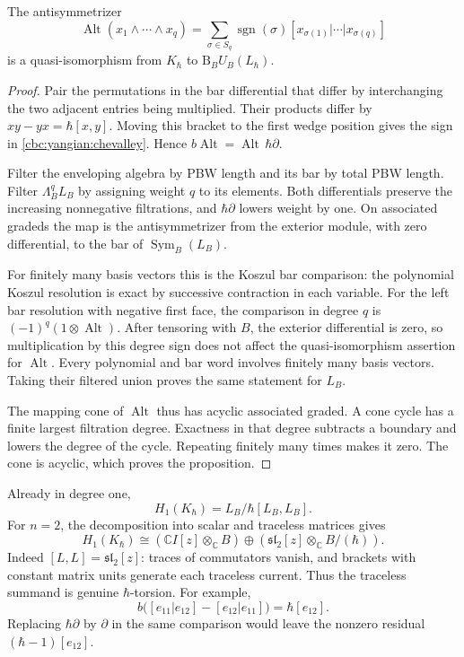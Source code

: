 \begin{proposition}\label{cbc:yangian:ce-bar}
The antisymmetrizer
\[
 \operatorname{Alt}(x_1\wedge\cdots\wedge x_q)
 =\sum_{\sigma\in S_q}\operatorname{sgn}(\sigma)
       [x_{\sigma(1)}|\cdots|x_{\sigma(q)}]
\]
is a quasi-isomorphism from $K_\hbar$ to
$\mathrm B_B U_B(L_\hbar)$.
\end{proposition}
\begin{proof}
Pair the permutations in the bar differential that differ by
interchanging the two adjacent entries being multiplied.  Their products
differ by $xy-yx=\hbar[x,y]$.  Moving this bracket to the first wedge
position gives the sign in \eqref{cbc:yangian:chevalley}.  Hence
$b\operatorname{Alt}=\operatorname{Alt}\,\hbar\partial$.

Filter the enveloping algebra by PBW length and its bar by total PBW
length.  Filter $\Lambda_B^qL_B$ by assigning weight $q$ to its elements.
Both differentials preserve the increasing nonnegative filtrations,
and $\hbar\partial$ lowers weight by one.  On associated gradeds the
map is the antisymmetrizer from the exterior module, with zero
differential, to the bar of $\operatorname{Sym}_B(L_B)$.

For finitely many basis vectors this is the Koszul bar comparison:
the polynomial Koszul resolution is exact by successive contraction
in each variable.  For the left bar resolution with negative first face,
the comparison in degree $q$ is $(-1)^q(1\otimes\operatorname{Alt})$.
After tensoring with $B$, the exterior differential
is zero, so multiplication by this degree sign does not affect the
quasi-isomorphism assertion for $\operatorname{Alt}$.
Every polynomial and bar word involves finitely many basis vectors.
Taking their filtered union proves the same statement for $L_B$.

The mapping cone of $\operatorname{Alt}$ thus has acyclic associated
graded.  A cone cycle has a finite largest filtration degree.  Exactness
in that degree subtracts a boundary and lowers the degree of the cycle.
Repeating finitely many times makes it zero.  The cone is acyclic,
which proves the proposition.
\end{proof}

Already in degree one,
\begin{equation}\label{cbc:yangian:first-homology}
 H_1(K_\hbar)=L_B/\hbar[L_B,L_B].
\end{equation}
For $n=2$, the decomposition into scalar and traceless matrices gives
\[
 H_1(K_\hbar)
 \cong (\mathbb C I[z]\otimes_{\mathbb C}B)
       \oplus(\mathfrak{sl}_2[z]\otimes_{\mathbb C}B/(\hbar)).
\]
Indeed $[L,L]=\mathfrak{sl}_2[z]$: traces of commutators vanish,
and brackets with constant matrix units generate each traceless
current.  Thus the traceless summand is genuine $\hbar$-torsion.
For example,
\[
 b\bigl([e_{11}|e_{12}]-[e_{12}|e_{11}]\bigr)
       =\hbar[e_{12}].
\]
Replacing $\hbar\partial$ by $\partial$ in the same comparison
would leave the nonzero residual $(\hbar-1)[e_{12}]$.

